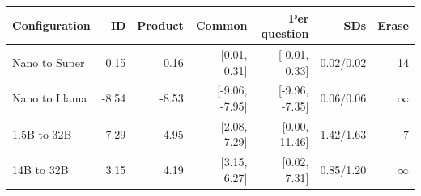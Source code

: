 \begin{tabular}{lrrrrrr}
\toprule
Configuration & ID & Product & Common & Per question & SDs & Erase \\
\midrule
Nano to Super & 0.15 & 0.16 & [0.01, 0.31] & [-0.01, 0.33] & 0.02/0.02 & 14 \\
Nano to Llama & -8.54 & -8.53 & [-9.06, -7.95] & [-9.96, -7.35] & 0.06/0.06 & $\infty$ \\
1.5B to 32B & 7.29 & 4.95 & [2.08, 7.29] & [0.00, 11.46] & 1.42/1.63 & 7 \\
14B to 32B & 3.15 & 4.19 & [3.15, 6.27] & [0.02, 7.31] & 0.85/1.20 & $\infty$ \\
\bottomrule
\end{tabular}
